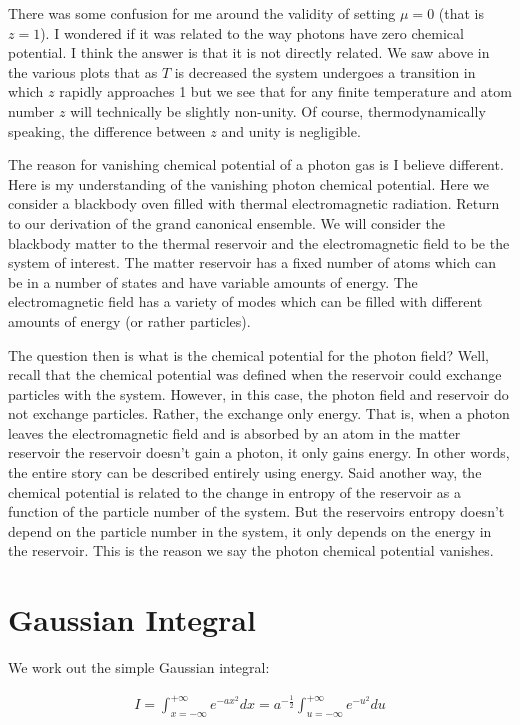 \documentclass[12pt]{article}
\begin{document}
There was some confusion for me around the validity of setting $\mu = 0$ (that is $z=1$). I wondered if it was related to the way photons have zero chemical potential. I think the answer is that it is not directly related. We saw above in the various plots that as $T$ is decreased the system undergoes a transition in which $z$ rapidly approaches 1 but we see that for any finite temperature and atom number $z$ will technically be slightly non-unity. Of course, thermodynamically speaking, the difference between $z$ and unity is negligible.

The reason for vanishing chemical potential of a photon gas is I believe different. Here is my understanding of the vanishing photon chemical potential. Here we consider a blackbody oven filled with thermal electromagnetic radiation. Return to our derivation of the grand canonical ensemble. We will consider the blackbody matter to the thermal reservoir and the electromagnetic field to be the system of interest. The matter reservoir has a fixed number of atoms which can be in a number of states and have variable amounts of energy. The electromagnetic field has a variety of modes which can be filled with different amounts of energy (or rather particles).

The question then is what is the chemical potential for the photon field? Well, recall that the chemical potential was defined when the reservoir could exchange particles with the system. However, in this case, the photon field and reservoir do not exchange particles. Rather, the exchange only energy. That is, when a photon leaves the electromagnetic field and is absorbed by an atom in the matter reservoir the reservoir doesn't gain a photon, it only gains energy. In other words, the entire story can be described entirely using energy. Said another way, the chemical potential is related to the change in entropy of the reservoir as a function of the particle number of the system. But the reservoirs entropy doesn't depend on the particle number in the system, it only depends on the energy in the reservoir. This is the reason we say the photon chemical potential vanishes.

\section{Gaussian Integral}

We work out the simple Gaussian integral:

\begin{align}
I = \int_{x=-\infty}^{+\infty} e^{-ax^2}dx = a^{-\frac{1}{2}}\int_{u=-\infty}^{+\infty}e^{-u^2}du
\end{align}
\end{document}
